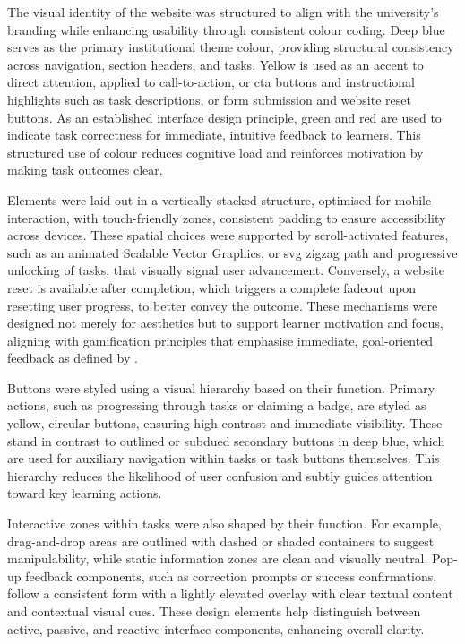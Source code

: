 The visual identity of the website was structured to align with the university's branding while enhancing usability through consistent colour coding. 
Deep blue serves as the primary institutional theme colour, providing structural consistency across navigation, section headers, and tasks. 
Yellow is used as an accent to direct attention, applied to call-to-action, or \acrshort{cta} buttons and instructional highlights such as task descriptions, or form submission and website reset buttons. 
As an established interface design principle, green and red are used to indicate task correctness for immediate, intuitive feedback to learners. 
This structured use of colour reduces cognitive load and reinforces motivation by making task outcomes clear.

Elements were laid out in a vertically stacked structure, optimised for mobile interaction, with touch-friendly zones, consistent padding to ensure accessibility across devices. 
These spatial choices were supported by scroll-activated features, such as an animated Scalable Vector Graphics, or \acrshort{svg} zigzag path and progressive unlocking of tasks, that visually signal user advancement. 
Conversely, a website reset is available after completion, which triggers a complete fadeout upon resetting user progress, to better convey the outcome. 
These mechanisms were designed not merely for aesthetics but to support learner motivation and focus, aligning with gamification principles that emphasise immediate, goal-oriented feedback as defined by \cite{redefinition}.

Buttons were styled using a visual hierarchy based on their function. 
Primary actions, such as progressing through tasks or claiming a badge, are styled as yellow, circular buttons, ensuring high contrast and immediate visibility. 
These stand in contrast to outlined or subdued secondary buttons in deep blue, which are used for auxiliary navigation within tasks or task buttons themselves. 
This hierarchy reduces the likelihood of user confusion and subtly guides attention toward key learning actions.

Interactive zones within tasks were also shaped by their function. 
For example, drag-and-drop areas are outlined with dashed or shaded containers to suggest manipulability, while static information zones are clean and visually neutral. 
Pop-up feedback components, such as correction prompts or success confirmations, follow a consistent form with a lightly elevated overlay with clear textual content and contextual visual cues. 
These design elements help distinguish between active, passive, and reactive interface components, enhancing overall clarity.

